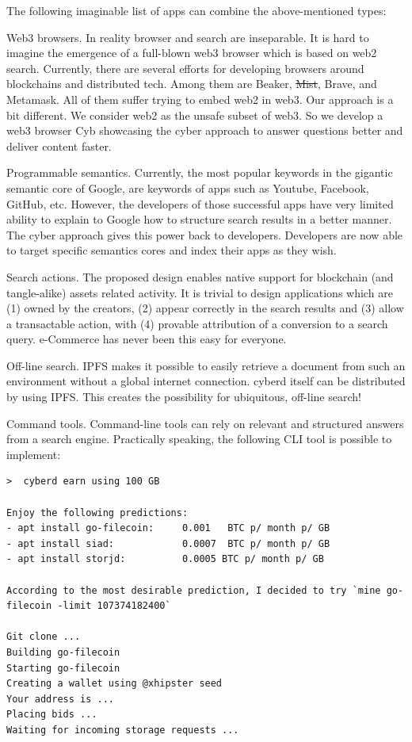 \documentclass[8pt,oneside]{amsart}
\newcommand{\code}[1]{{\PlayBold #1}}
\begin{document}
The following imaginable list of apps can combine the above-mentioned types:

\code{Web3 browsers}. In reality browser and search are inseparable. It is hard to imagine the emergence of a full-blown web3 browser which is based on web2 search. Currently, there are several efforts for developing browsers around blockchains and distributed tech. Among them are Beaker, \sout{Mist}, Brave, and Metamask. All of them suffer trying to embed web2 in web3. Our approach is a bit different. We consider web2 as the unsafe subset of web3. So we develop a web3 browser Cyb showcasing the cyber approach to answer questions better and deliver content faster.

\code{Programmable semantics}. Currently, the most popular keywords in the gigantic semantic core of Google, are keywords of apps such as Youtube, Facebook, GitHub, etc. However, the developers of those successful apps have very limited ability to explain to Google how to structure search results in a better manner. The cyber approach gives this power back to developers. Developers are now able to target specific semantics cores and index their apps as they wish.

\code{Search actions}. The proposed design enables native support for blockchain (and tangle-alike) assets related activity. It is trivial to design applications which are (1) owned by the creators, (2) appear correctly in the search results and (3) allow a transactable action, with (4) provable attribution of a conversion to a search query. e-Commerce has never been this easy for everyone.

\code{Off-line search}. IPFS makes it possible to easily retrieve a document from such an environment without a global internet connection. cyberd itself can be distributed by using IPFS. This creates the possibility for ubiquitous, off-line search!

\code{Command tools}. Command-line tools can rely on relevant and structured answers from a search engine. Practically speaking, the following CLI tool is possible to implement:

\begin{lstlisting}
>  cyberd earn using 100 GB

Enjoy the following predictions:
- apt install go-filecoin:     0.001   BTC p/ month p/ GB
- apt install siad:            0.0007  BTC p/ month p/ GB
- apt install storjd:          0.0005 BTC p/ month p/ GB

According to the most desirable prediction, I decided to try `mine go-filecoin -limit 107374182400`

Git clone ...
Building go-filecoin
Starting go-filecoin
Creating a wallet using @xhipster seed
Your address is ...
Placing bids ...
Waiting for incoming storage requests ...

\end{lstlisting}
\end{document}
